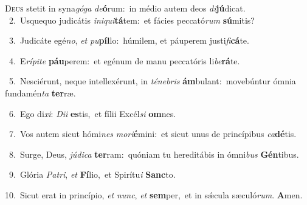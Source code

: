 \lettrine{\initial\textcolor{\initialcolor}{D}}{eus} stetit in syna\-\textit{gó}\-\textit{ga} \textit{de}\-\textbf{ó}rum:~\star in médio autem deos \textit{di}\-\textbf{jú}dicat.\\
{\numbfont\textcolor{\numbcolor}{~2.}}~Usquequo judicátis \textit{in}\-\textit{i}\textit{qui}\textbf{tá}tem:~\star et fácies peccató\textit{rum} \textbf{sú}\-mitis?\par
{\numbfont\textcolor{\numbcolor}{~3.}}~Judicáte egé\-\textit{no}\-, \textit{et} \textit{pu}\-\textbf{píl}lo:~\star húmilem, et páuperem justi\-\textit{fi}\-\textbf{cá}te.\par
{\numbfont\textcolor{\numbcolor}{~4.}}~E\-\textit{rí}\-\textit{pi}\textit{te} \textbf{páu}\-perem:~\star et egénum de manu peccatóris li\-\textit{be}\-\textbf{rá}te.\par
{\numbfont\textcolor{\numbcolor}{~5.}}~Nesciérunt, neque intellexérunt, in \textit{té}\-\textit{ne}\textit{bris} \textbf{ám}\-bulant:~\star movebúntur ómnia fundamén\textit{ta} \textbf{ter}\-ræ.\par
{\numbfont\textcolor{\numbcolor}{~6.}}~Ego di\-\textit{xi}\-: \textit{Di}\-\textit{i} \textbf{es}\-tis,~\star et fílii Excél\textit{si} \textbf{om}\-nes.\par
{\numbfont\textcolor{\numbcolor}{~7.}}~Vos autem sicut hómi\textit{nes} \textit{mo}\-\textit{ri}\textbf{é}mini:~\star et sicut unus de princípibus \textit{ca}\-\textbf{dé}tis.\par
{\numbfont\textcolor{\numbcolor}{~8.}}~Surge, Deus, \textit{jú}\-\textit{di}\textit{ca} \textbf{ter}\-ram:~\star quóniam tu hereditábis in ómni\textit{bus} \textbf{Gén}\-tibus.\par
{\numbfont\textcolor{\numbcolor}{~9.}}~Glória \textit{Pa}\-\textit{tri}, \textit{et} \textbf{Fí}\-lio,~\star et Spirítu\textit{i} \textbf{Sanc}\-to.\par
{\numbfont\textcolor{\numbcolor}{10.}}~Sicut erat in princípio, \textit{et} \textit{nunc}\-, \textit{et} \textbf{sem}\-per,~\star et in sǽcula sæculó\-\textit{rum}\-. \textbf{A}\-men.\par
